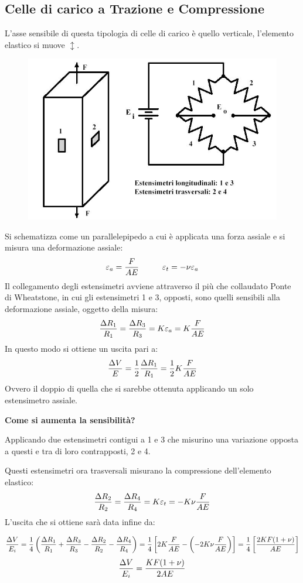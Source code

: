 \documentclass[a4paper, 15pt]{article}
\begin{document}
\subsection{Celle di carico a Trazione e Compressione}		
\begin{adjustwidth}{2in}{}	
	 	L'asse sensibile di questa tipologia di celle di carico è quello verticale, l'elemento elastico si muove $\updownarrow$.  
	 	\begin{figure}[H]
	 		\centering
	 		\includegraphics[width=0.3\linewidth]{immagini/11}
	 		\label{fig:11}
	 	\end{figure}	 	
	 	Si schematizza come un parallelepipedo a cui è applicata una forza assiale e si misura una deformazione assiale:
	 	\[\varepsilon_a = {F\over AE} \hspace{1cm} \varepsilon_t = -\nu\varepsilon_a\]
	 	Il collegamento degli estensimetri avviene attraverso il più che collaudato Ponte di Wheatstone, in cui gli estensimetri 1 e 3, opposti, sono quelli sensibili alla deformazione assiale, oggetto della misura: 
	 	\[{\Delta R_1\over R_1} = {\Delta R_3\over R_3} = K\varepsilon_a = K{F\over AE}\]
	 	In questo modo si ottiene un uscita pari a:
	 	\[{\Delta V\over E} = {1\over 2}{\Delta R_1\over R_1} = {1\over 2} K{F\over AE}\]
	 	Ovvero il doppio di quella che si sarebbe ottenuta applicando un solo estensimetro assiale. \newline 
	 	
	 	\textbf{Come si aumenta la sensibilità?} 
	 	
	 	Applicando due estensimetri contigui a 1 e 3 che misurino una variazione opposta a questi e tra di loro contrapposti, 2 e 4. 
	 	
	 	Questi estensimetri ora trasversali misurano la compressione dell'elemento elastico:
	 	\[{\Delta R_2\over R_2} = {\Delta R_4\over R_4} = K\varepsilon_t = -K\nu{F\over AE}\]
	 	L'uscita che si ottiene sarà data infine da:
\end{adjustwidth} 
	 	\[{\Delta V\over E_i} = {1\over 4} \left({\Delta R_1\over R_1} + {\Delta R_3\over R_3} -{\Delta R_2\over R_2} - {\Delta R_4\over R_4}\right) = {1\over 4}\left[2K{F\over AE}-\left(-2K\nu{F\over AE}\right)\right] = {1\over 4} \left[{2KF(1+\nu)\over AE}\right]\]
	 	\[{\Delta V\over E_i} = {KF(1+\nu)\over2 AE}\] 
\end{document}
